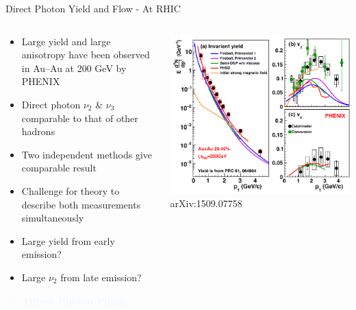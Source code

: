 \documentclass[aspectratio=169,10pt]{beamer}
\begin{document}
\begin{frame}{Direct Photon Yield and Flow - At RHIC}
  \begin{columns}
    \begin{column}{6cm}
      \begin{itemize}
        \item Large yield and large anisotropy have been observed in Au--Au at 200 GeV by PHENIX
        \item Direct photon $\nu_{2}$ \& $\nu_{3}$ comparable to that of other hadrons
        \item Two independent methods give comparable result
        \item Challenge for theory to describe both measurements simultaneously
        \item Large yield from early emission?
        \item Large $\nu_{2}$ from late emission?
      \end{itemize}
      \vspace{1cm}
      \centering
      \Large \textbf{\textcolor{AliceBlue}{$\Rightarrow$ Direct Photon Puzzle}}
    \end{column}
    \begin{column}{8.5cm}
      \vspace{-0.15cm}
      \includegraphics[height=0.9\textheight]{EMLectureWeek2018/PHENIX2040_summaryDirGammaAll.pdf}\\
      \vspace{-0.3cm} \hspace{0.95cm} \tiny arXiv:1509.07758
    \end{column}

  \end{columns}

\end{frame}
\end{document}
